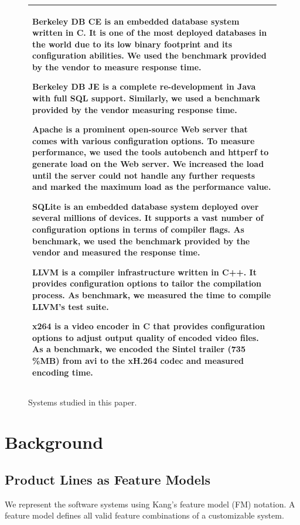 \documentclass{sig-alternative}
\begin{document}
\begin{figure}\small
\begin{tabular}{|p{.95\linewidth}|}\hline
\textbf{Berkeley DB CE} is an embedded database system written in C. It is one of the most deployed databases in the world due to its low binary footprint and its configuration abilities. We used the benchmark provided by the vendor to measure response time.

\textbf{Berkeley DB JE} is a complete re-development in Java with full SQL support. Similarly, we used a benchmark provided by the vendor measuring response time.

\textbf{Apache} is a prominent open-source Web server that comes with various configuration options. To measure performance, we used the tools autobench and httperf to generate load on the Web server. We increased the load until the server could not handle any further requests and marked the maximum load as the performance value.

\textbf{SQLite} is an embedded database system deployed over several millions of devices. It supports a vast number of configuration options in terms of compiler flags. As benchmark, we used the benchmark provided by the vendor and measured the response time.

\textbf{LLVM} is a compiler infrastructure written in C++. It provides configuration options to tailor the compilation process. As benchmark, we measured the time to compile LLVM's test suite.

\textbf{x264} is a video encoder in C that provides configuration options to adjust output quality of encoded video files. As a benchmark, we encoded the Sintel trailer (735\,\%MB) from avi to the xH.264 codec and measured encoding time.\\\hline
\end{tabular}
\caption{Systems studied in this paper.}\label{fig:systems}
\end{figure}



\section{Background}  

\subsection{Product Lines as Feature Models}
We represent the software systems using Kang's feature model (FM) notation. 
A feature model defines all valid feature combinations of a customizable system. 
\end{document}
